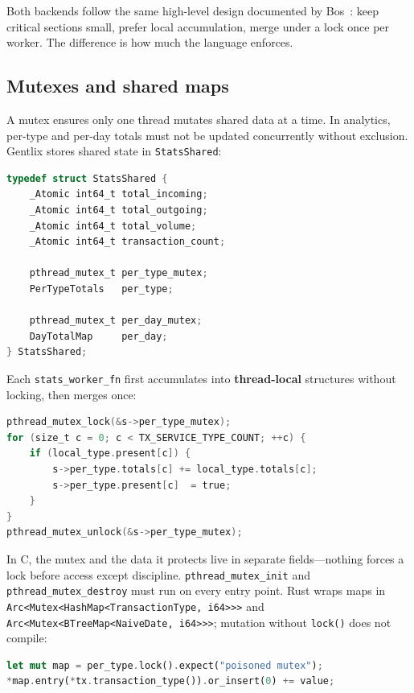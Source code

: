 Both backends follow the same high-level design documented by Bos~\cite{Bos2023}:
keep critical sections small, prefer local accumulation, merge under a lock once per
worker. The difference is how much the language enforces.

\subsection{Mutexes and shared maps}
\label{subsec:ch5sec3mutex}

A mutex ensures only one thread mutates shared data at a time. In analytics, per-type and
per-day totals must not be updated concurrently without exclusion. Gentlix stores shared
state in \texttt{StatsShared}:

\begin{lstlisting}[language=C, caption={transaction\_service.c --- Atomics hold
global counters; mutexes protect richer maps.}]
typedef struct StatsShared {
    _Atomic int64_t total_incoming;
    _Atomic int64_t total_outgoing;
    _Atomic int64_t total_volume;
    _Atomic int64_t transaction_count;

    pthread_mutex_t per_type_mutex;
    PerTypeTotals   per_type;

    pthread_mutex_t per_day_mutex;
    DayTotalMap     per_day;
} StatsShared;
\end{lstlisting}

Each \texttt{stats\_worker\_fn} first accumulates into \textbf{thread-local} structures
without locking, then merges once:

\begin{lstlisting}[language=C, caption={transaction\_service.c --- Locks are held
only during the merge phase, not in the hot loop.}]
pthread_mutex_lock(&s->per_type_mutex);
for (size_t c = 0; c < TX_SERVICE_TYPE_COUNT; ++c) {
    if (local_type.present[c]) {
        s->per_type.totals[c] += local_type.totals[c];
        s->per_type.present[c]  = true;
    }
}
pthread_mutex_unlock(&s->per_type_mutex);
\end{lstlisting}

In C, the mutex and the data it protects live in separate fields---nothing forces a lock
before access except discipline. \texttt{pthread\_mutex\_init} and
\texttt{pthread\_mutex\_destroy} must run on every entry point. Rust wraps maps in
\texttt{Arc<Mutex<HashMap<TransactionType, i64>>>} and
\texttt{Arc<Mutex<BTreeMap<NaiveDate, i64>>>}; mutation without \texttt{lock()} does not
compile:

\begin{lstlisting}[language=Rust, caption={transaction.rs (service) --- The mutex and
map are one unit; the guard releases on drop.}]
let mut map = per_type.lock().expect("poisoned mutex");
*map.entry(*tx.transaction_type()).or_insert(0) += value;
\end{lstlisting}

